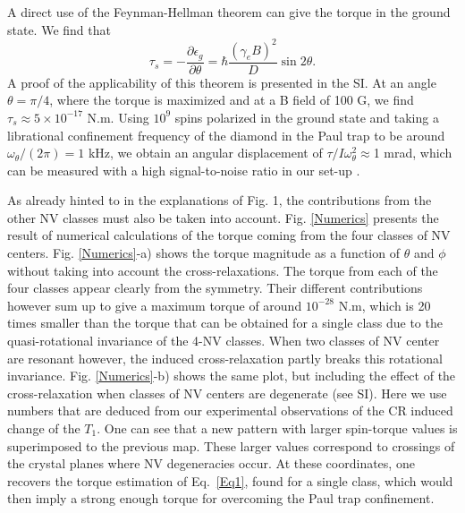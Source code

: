\documentclass[preprintnumbers,amsmath,amssymb,superscriptaddress,twocolumn,showpacs]{revtex4-1}
\begin{document}
A direct use of the Feynman-Hellman theorem can give the torque in the ground state. We find that 
\begin{equation}\tau_s=- \frac{\partial \epsilon_g}{\partial \theta}=\hbar  \frac{(\gamma_e B)^2}{D} \sin 2\theta.\label{Eq1}
\end{equation}
A proof of the applicability of this theorem is presented in the SI. 
At an angle $\theta=\pi/4$, where the torque is maximized and at a B field of 100 G, we find $\tau_s\approx 5\times 10^{-17}$ N.m. Using $10^9$ spins polarized in the ground state and taking a librational confinement frequency of the diamond in the Paul trap to be around $\omega_\theta/(2\pi)=1$ kHz, we obtain an angular displacement 
of $\tau/I\omega_\theta^2\approx$1 mrad, which can be measured with a high signal-to-noise ratio in our set-up \cite{DelordNat}.


As already hinted to in the explanations of Fig. 1, the contributions from the other NV classes must also be taken into account.
Fig. \ref{Numerics} presents the result of numerical calculations of the torque coming from the four classes of NV centers.   
Fig. \ref{Numerics}-a) shows the torque magnitude as a function of $\theta$ and $\phi$ without taking into account the cross-relaxations. The torque from each of the four classes appear clearly from the symmetry. Their different contributions however sum up to give a maximum torque of around $10^{-28}$ N.m, which is 20 times smaller than the torque that can be obtained for a single class due to the quasi-rotational invariance of the 4-NV classes. When two classes of NV center are resonant however, the induced cross-relaxation partly breaks this rotational invariance. 
Fig. \ref{Numerics}-b) shows the same plot, but including the effect of the cross-relaxation when classes of NV centers are degenerate (see SI).  
Here we use numbers that are deduced from our experimental observations of the CR induced change of the $T_1$.
One can see that a new pattern with larger spin-torque values is superimposed to the previous map. These larger values correspond to crossings of the crystal planes where NV degeneracies occur. 
At these coordinates, one recovers the torque estimation of Eq.~\ref{Eq1}, found for a single class, which would then imply a strong enough torque for overcoming the Paul trap confinement. 
\end{document}
